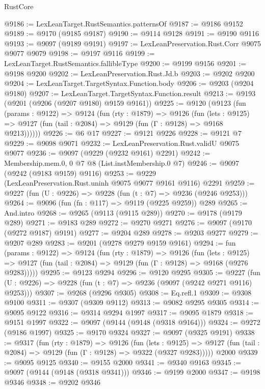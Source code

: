 \begin{lexlean}{RustCore}
\begin{coremodule}
@9186 := LexLeanTarget.RustSemantics.patternsOf
@9187 := @9186 @9152
@9189 := @9170 (@9185 @9187)
@9190 := @9114 @9128
@9191 := @9190 @9116
@9193 := @9097 (@9189 @9191)
@9197 := LexLeanPreservation.Rust.Corr @9075 @9077 @9079
@9198 := @9197 @9116
@9199 := LexLeanTarget.RustSemantics.fallibleType
@9200 := @9199 @9156
@9201 := @9198 @9200
@9202 := LexLeanPreservation.Rust.Jd.b
@9203 := @9202 @9200
@9204 := LexLeanTarget.TargetSyntax.Function.body
@9206 := @9203 (@9204 @9180)
@9207 := LexLeanTarget.TargetSyntax.Function.result
@9213 := @9193 (@9201 (@9206 (@9207 @9180) @9159 @9161))
@9225 := @9120
    (@9123
      (fun (params : @9122) =>
      @9124
        (fun (rty : @1879) =>
        @9126
          (fun (lets : @9125) =>
          @9127 (fun (tail : @2084) => @9129 (fun (Γ : @9128) => @9168 @9213))))))
@9226 := @6 @17
@9227 := @9121 @9226
@9228 := @9121 @7
@9229 := @9098 @9071
@9232 := LexLeanPreservation.Rust.validU @9075 @9077
@9236 := @9097 (@9229 (@9232 @9161) @2291)
@9242 := Membership.mem.{0, 0} @7 @8 (List.instMembership.{0} @7)
@9246 := @9097 (@9242 (@9183 @9159) @9116)
@9253 := @9229 (LexLeanPreservation.Rust.uninh @9075 @9077 @9161 @9116) @2291
@9259 := @9227 (fun (U : @9226) => @9228 (fun (t : @7) => @9236 (@9246 @9253)))
@9264 := @9096 (fun (fn : @117) => @9119 (@9225 @9259)) @289
@9265 := And.intro
@9268 := @9265 (@9113 (@9115 @289))
@9270 := @9178 (@9179 @289)
@9271 := @9183 @289
@9272 := @9270 @9271
@9276 := @9097 (@9170 (@9272 @9187) @9191)
@9277 := @9204 @289
@9278 := @9203 @9277
@9279 := @9207 @289
@9283 := @9201 (@9278 @9279 @9159 @9161)
@9294 := fun (params : @9122) =>
  @9124
    (fun (rty : @1879) =>
    @9126
      (fun (lets : @9125) =>
      @9127 (fun (tail : @2084) => @9129 (fun (Γ : @9128) => @9168 (@9276 @9283)))))
@9295 := @9123 @9294
@9296 := @9120 @9295
@9305 := @9227 (fun (U : @9226) => @9228 (fun (t : @7) => @9236 (@9097 (@9242 @9271 @9116) @9253)))
@9307 := @9268 (@9296 @9305)
@9308 := Eq.refl.{1}
@9309 := @9308 @9100
@9311 := @9307 (@9309 @9112)
@9313 := @9082 @9295 @9305
@9314 := @9095 @9122
@9316 := @9314 @9294 @1997
@9317 := @9095 @1879
@9318 := @9151 @1997
@9322 := @9097 (@9144 (@9148 (@9318 @9164)))
@9324 := @9272 (@9186 @1997)
@9325 := @9170 @9324
@9327 := @9097 (@9325 @9191)
@9338 := @9317
    (fun (rty : @1879) =>
    @9126
      (fun (lets : @9125) =>
      @9127 (fun (tail : @2084) => @9129 (fun (Γ : @9128) => @9322 (@9327 @9283)))))
    @2000
@9339 := @9095 @9125
@9340 := @9155 @2000
@9341 := @9340 @9163
@9345 := @9097 (@9144 (@9148 (@9318 @9341)))
@9346 := @9199 @2000
@9347 := @9198 @9346
@9348 := @9202 @9346

\end{coremodule}
\end{lexlean}
